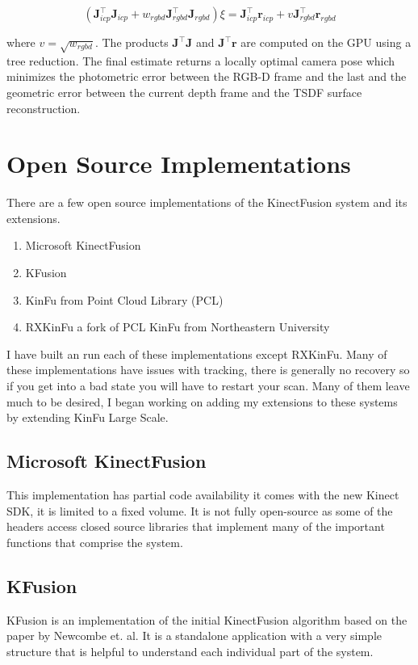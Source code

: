 \documentclass[10pt, twocolumn]{article}
\begin{document}
\begin{equation}
(\mathbf{J}^{\top}_{icp} \mathbf{J}_{icp} + w_{rgbd} \mathbf{J}^{\top}_{rgbd} \mathbf{J}_{rgbd}) \xi = \mathbf{J}^{\top}_{icp} \mathbf{r}_{icp} + v \mathbf{J}^{\top}_{rgbd} \mathbf{r}_{rgbd}
\end{equation}

where $v = \sqrt{w_{rgbd}}$. The products $\mathbf{J}^{\top}\mathbf{J}$ and $\mathbf{J}^{\top} \mathbf{r}$ are computed on the GPU using a tree reduction. The final estimate returns a locally optimal camera pose which minimizes the photometric error between the RGB-D frame and the last and the geometric error between the current depth frame and the TSDF surface reconstruction.


\section{Open Source Implementations} \label{sec:opensource}
There are a few open source implementations of the KinectFusion system and its extensions. 
\begin{enumerate}
  \item Microsoft KinectFusion \cite{MSKinectFusion}
  \item KFusion \cite{kfusion}
  \item KinFu from Point Cloud Library (PCL) \cite{kinfu}
  \item RXKinFu a fork of PCL KinFu from Northeastern University \cite{RXKinFu}
\end{enumerate}

I have built an run each of these implementations except RXKinFu.  Many of these implementations have issues with tracking, there is generally no recovery so if you get into a bad state you will have to restart your scan. Many of them leave much to be desired, I began working on adding my extensions to these systems by extending KinFu Large Scale.

\subsection{Microsoft KinectFusion}
This implementation has partial code availability it comes with the new Kinect SDK, it is limited to a fixed volume. It is not fully open-source as some of the headers access closed source libraries that implement many of the important functions that comprise the system. 

\subsection{KFusion}
KFusion is an implementation of the initial KinectFusion algorithm based on the paper by Newcombe et. al. It is a standalone application with a very simple structure that is helpful to understand each individual part of the system.
\end{document}

